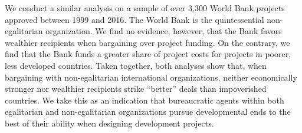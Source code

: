 \documentclass{article}
\begin{document}
We conduct a similar analysis on a sample of over 3,300 World Bank projects approved between 1999 and 2016.  The World Bank is the quintessential non-egalitarian organization.  We find no evidence, however, that the Bank favors wealthier recipients when bargaining over project funding.  On the contrary, we find that the Bank funds a greater share of project costs for projects in poorer, less developed countries. Taken together, both analyses show that, when bargaining with non-egalitarian international organizations, neither economically stronger nor wealthier recipients strike “better” deals than impoverished countries.  We take this as an indication that bureaucratic agents within both egalitarian and non-egalitarian organizations pursue developmental ends to the best of their ability when designing development projects.

\newpage
\end{document}
